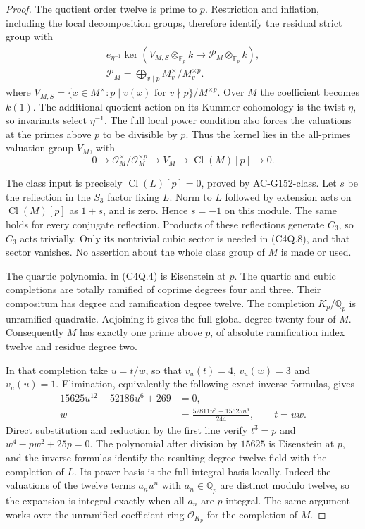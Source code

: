 \begin{proof}
The quotient order twelve is prime to $p$.
Restriction and inflation, including the local decomposition groups,
therefore identify the residual strict group with
\[
 \begin{gathered}
 e_{\eta^{-1}}\ker\left(V_{M,S}\otimes_{\mathbb F_p}k
       \longrightarrow\mathcal P_M\otimes_{\mathbb F_p}k\right),\\
 \mathcal P_M=\bigoplus_{v\mid p}M_v^\times/M_v^{\times p}.
 \end{gathered}
 \tag{C4Q.8}
\]
where
$V_{M,S}=\{x\in M^\times:p\mid v(x)\text{ for }v\nmid p\}/M^{\times p}$.
Over $M$ the coefficient becomes $k(1)$.
The additional quotient action on its Kummer cohomology is the twist
$\eta$, so invariants select $\eta^{-1}$.
The full local power condition also forces the valuations at the
primes above $p$ to be divisible by $p$.
Thus the kernel lies in the all-primes valuation group $V_M$, with
\[
 0\longrightarrow\mathcal O_M^\times/\mathcal O_M^{\times p}
 \longrightarrow V_M\longrightarrow\operatorname{Cl}(M)[p]
 \longrightarrow0.
 \tag{C4Q.9}
\]

The class input is precisely $\operatorname{Cl}(L)[p]=0$,
proved by AC-G152-class.  Let $s$ be the reflection in the
$S_3$ factor fixing $L$.
Norm to $L$ followed by extension acts on $\operatorname{Cl}(M)[p]$
as $1+s$, and is zero.  Hence $s=-1$ on this module.
The same holds for every conjugate reflection.  Products of these
reflections generate $C_3$, so $C_3$ acts trivially.
Only its nontrivial cubic sector is needed in (C4Q.8), and that
sector vanishes.  No assertion about the whole class group of $M$
is made or used.

The quartic polynomial in (C4Q.4) is Eisenstein at $p$.
The quartic and cubic completions are totally ramified of coprime
degrees four and three.  Their compositum has degree and
ramification degree twelve.
The completion $K_p/\mathbb Q_p$ is unramified quadratic.
Adjoining it gives the full global degree twenty-four of $M$.
Consequently $M$ has exactly one prime above $p$, of absolute
ramification index twelve and residue degree two.

In that completion take $u=t/w$, so that $v_u(t)=4$,
$v_u(w)=3$ and $v_u(u)=1$.
Elimination, equivalently the following exact inverse formulas, gives
\[
 \begin{aligned}
 15625u^{12}-52186u^6+269&=0,\\
 w&=\frac{52811u^3-15625u^9}{244},\qquad t=uw.
 \end{aligned}
 \tag{C4Q.10}
\]
Direct substitution and reduction by the first line verify
$t^3=p$ and $w^4-pw^2+25p=0$.
The polynomial after division by $15625$ is Eisenstein at $p$,
and the inverse formulas identify the resulting degree-twelve
field with the completion of $L$.
Its power basis is the full integral basis locally.
Indeed the valuations of the twelve terms $a_nu^n$ with
$a_n\in\mathbb Q_p$ are distinct modulo twelve, so the expansion
is integral exactly when all $a_n$ are $p$-integral.
The same argument works over the unramified coefficient ring
$\mathcal O_{K_p}$ for the completion of $M$.


\end{proof}
